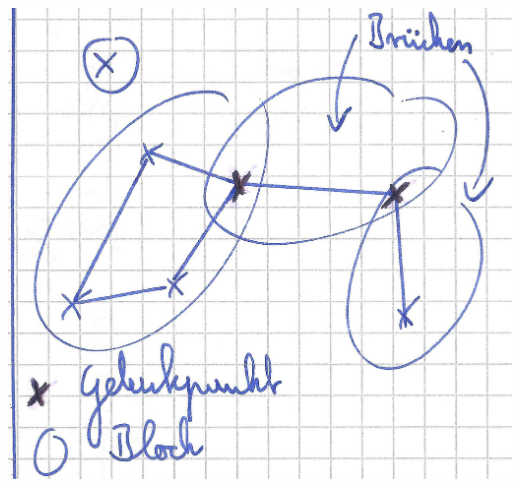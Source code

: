\documentclass[10pt,a4paper]{article}
\begin{document}
\begin{center}
\includegraphics[scale=0.55]{bloecke.jpg} 
\end{center}
\end{document}
